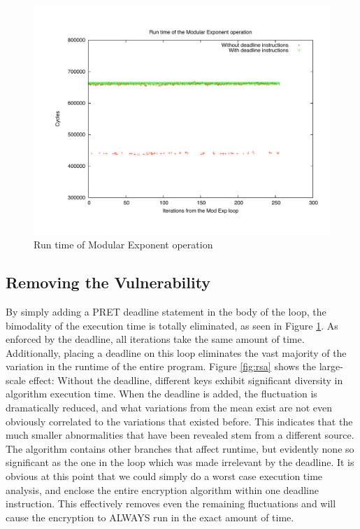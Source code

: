 \documentclass[times, 10pt,twocolumn]{article}
\begin{document}
\begin{figure}[ht]
  \centering
  \includegraphics[scale=.3]{./images/ModExp.pdf}
  \caption{Run time of Modular Exponent operation}
  \label{fig:modexp}
\end{figure}

\subsection{Removing the Vulnerability}
By simply adding a PRET deadline statement in the body of the loop, the bimodality of the execution time is totally eliminated, as seen in Figure \ref{fig:modexp}.  As enforced by the deadline, all iterations take the same amount of time.  Additionally, placing a deadline on this loop eliminates the vast majority of the variation in the runtime of the entire program.  Figure \ref{fig:rsa} shows the large-scale effect:  Without the deadline, different keys exhibit significant diversity in algorithm execution time.  When the deadline is added, the fluctuation is dramatically reduced, and what variations from the mean exist are not even obviously correlated to the variations that existed before.  This indicates that the much smaller abnormalities that have been revealed stem from a different source.  The algorithm contains other branches that affect runtime, but evidently none so significant as the one in the loop which was made irrelevant by the deadline. It is obvious at this point that we could simply do a worst case execution time analysis, and enclose the entire encryption algorithm within one deadline instruction. This effectively removes even the remaining fluctuations and will cause the encryption to ALWAYS run in the exact amount of time.
\end{document}
